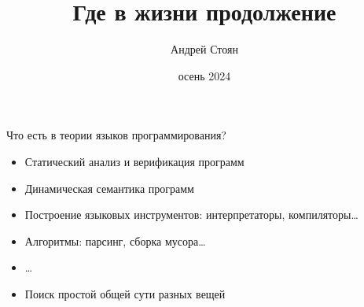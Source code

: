 
\newif\ifhandout




\title[Где в жизни продолжение]{Где в жизни продолжение}
\author[Андрей Стоян]{Андрей Стоян}
\date{осень 2024}



    \setcounter{framenumber}{-1}
    \mymaketitle

    \begin{frame}[fragile]{Что есть в теории языков программирования?}
        \begin{itemize}
            \item[\practical] Статический анализ и верификация программ
            \item[\practical] Динамическая семантика программ
            \item[\practical] Построение языковых инструментов: интерпретаторы, компиляторы\ldots
            \item[\practical] Алгоритмы: парсинг, сборка мусора\ldots
            \item[\practical] \ldots
            \item[\answer] \pause Поиск простой общей сути разных вещей
        \end{itemize}
    \end{frame}

